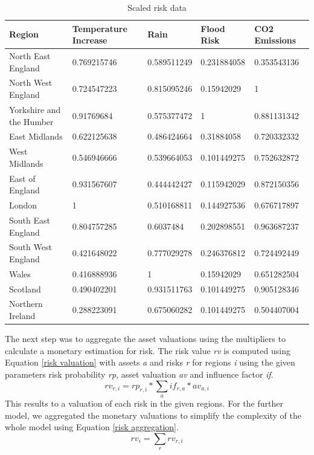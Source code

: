 \documentclass[10pt,a4paper]{article}
\begin{document}
    \begin{table}[H]
    \centering
    \begin{tabular}{|l|l|l|l|l|}
    \hline
    Region                   & Temperature   Increase & Rain        & Flood Risk  & CO2 Emissions \\ \hline
    North East England       & 0.769215746            & 0.589511249 & 0.231884058 & 0.353543136   \\ \hline
    North West England       & 0.724547223            & 0.815095246 & 0.15942029  & 1             \\ \hline
    Yorkshire and the Humber & 0.91769684             & 0.575377472 & 1           & 0.881131342   \\ \hline
    East Midlands            & 0.622125638            & 0.486424664 & 0.31884058  & 0.720332332   \\ \hline
    West Midlands            & 0.546946666            & 0.539664053 & 0.101449275 & 0.752632872   \\ \hline
    East of England          & 0.931567607            & 0.444442427 & 0.115942029 & 0.872150356   \\ \hline
    London                   & 1                      & 0.510168811 & 0.144927536 & 0.676717897   \\ \hline
    South East England       & 0.804757285            & 0.6037484   & 0.202898551 & 0.963687237   \\ \hline
    South West England       & 0.421648022            & 0.777029278 & 0.246376812 & 0.724492449   \\ \hline
    Wales                    & 0.416888936            & 1           & 0.15942029  & 0.651282504   \\ \hline
    Scotland                 & 0.490402201            & 0.931511763 & 0.101449275 & 0.905128346   \\ \hline
    Northern Ireland         & 0.288223091            & 0.675060282 & 0.101449275 & 0.504407004   \\ \hline
    \end{tabular}
    \caption{Scaled risk data}
    \label{scaled risk}
    \end{table}
    
    The next step was to aggregate the asset valuations using the multipliers to calculate a monetary estimation for risk. The risk value \textit{rv} is computed using Equation \ref{risk valuation} with assets \textit{a} and risks \textit{r} for regions \textit{i} using the given parameters risk probability \textit{rp}, asset valuation \textit{av} and influence factor \textit{if}.
    \begin{equation}
        rv_{r,i} = rp_{r,i}*\sum_{a}{if_{r,a}*av_{a,i}}
        \label{risk valuation}
    \end{equation}
    This results to a valuation of each risk in the given regions. For the further model, we aggregated the monetary valuations to simplify the complexity of the whole model using Equation \ref{risk aggregation}.
    \begin{equation}
        rv_{i} = \sum_{r}{rv_{r,i}}
        \label{risk aggregation}
    \end{equation}
\newpage
\end{document}
